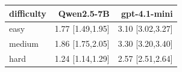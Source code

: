 \begin{tabular}{lrr}
\toprule
difficulty & Qwen2.5-7B & gpt-4.1-mini \\
\midrule
easy & 1.77 [1.49,1.95] & 3.10 [3.02,3.27] \\
medium & 1.86 [1.75,2.05] & 3.30 [3.20,3.40] \\
hard & 1.24 [1.14,1.29] & 2.57 [2.51,2.64] \\
\bottomrule
\end{tabular}
